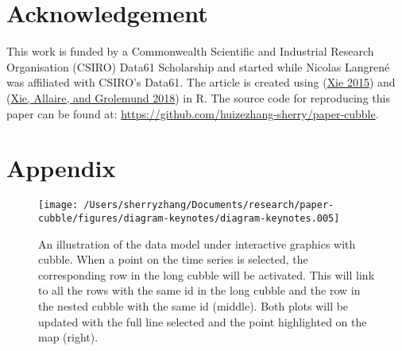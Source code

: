 \documentclass{article}
\begin{document}
\newpage

\hypertarget{acknowledgement}{%
\section{Acknowledgement}\label{acknowledgement}}

This work is funded by a Commonwealth Scientific and Industrial Research Organisation (CSIRO) Data61 Scholarship and started while Nicolas Langrené was affiliated with CSIRO's Data61. The article is created using  (\protect\hyperlink{ref-knitr}{Xie 2015}) and  (\protect\hyperlink{ref-rmarkdown}{Xie, Allaire, and Grolemund 2018}) in R. The source code for reproducing this paper can be found at: \url{https://github.com/huizezhang-sherry/paper-cubble}.

\hypertarget{appendix}{%
\section{Appendix}\label{appendix}}

\begin{figure}

{\centering \texttt{[image: /Users/sherryzhang/Documents/research/paper-cubble/figures/diagram-keynotes/diagram-keynotes.005]} 

}

\caption{An illustration of the data model under interactive graphics with cubble. When a point on the time series is selected, the corresponding row in the long cubble will be activated. This will link to all the rows with the same id in the long cubble and the row in the nested cubble with the same id (middle). Both plots will be updated with the full line selected and the point highlighted on the map (right).}\label{fig:illu-interactive-2}
\end{figure}

\newpage
\end{document}
